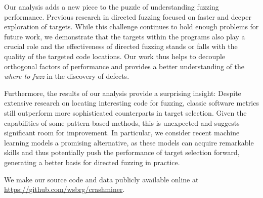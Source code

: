 Our analysis adds a new piece to the puzzle of understanding fuzzing performance.
Previous research in directed fuzzing focused on faster and deeper exploration of targets.
While this challenge continues to hold enough problems for future work, we demonstrate that the targets within the programs also play a crucial role and the effectiveness of directed fuzzing stands or falls with the quality of the targeted code locations. Our work thus helps to decouple orthogonal factors of performance and provides a better understanding of the \emph{where to fuzz} in the discovery of defects.

Furthermore, the results of our analysis provide a surprising insight: Despite extensive research on locating interesting code for fuzzing, classic software metrics still outperform more sophisticated counterparts in target selection. Given the capabilities of some pattern-based methods, this is unexpected and suggests significant room for improvement. In particular, we consider recent machine learning models a promising alternative, as these models can acquire remarkable skills and thus potentially push the performance of target selection forward,  generating a better basis for directed fuzzing in practice.

We make our source code and data publicly available online at \url{https://github.com/wsbrg/crashminer}.
